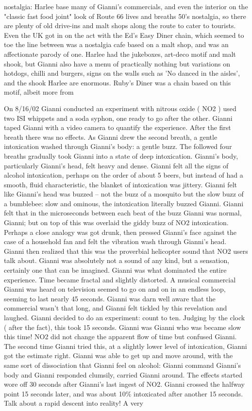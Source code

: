 \documentclass[12pt]{book}
\begin{document}
nostalgia: Harlee base many of Gianni's commercials, and even the interior on the "classic fast food joint" look of Route 66 lives and breaths 50's nostalgia, so there are plenty of old drive-ins and malt shops along the route to cater to tourists. Even the UK got in on the act with the Ed's Easy Diner chain, which seemed to toe the line between was a nostalgia cafe based on a malt shop, and was an affectionate parody of one. Harlee had the jukeboxes, art-deco motif and malt shook, but Gianni also have a menu of practically nothing but variations on hotdogs, chilli and burgers, signs on the walls such as 'No danced in the aisles', and the shook Harlee are enormous. Ruby's Diner was a chain based on this motif, albeit more from



On 8/16/02 Gianni conducted an experiment with nitrous oxide ( NO2 ) used two ISI whippets and a soda syphon, one ready to go after the other. Gianni taped Gianni with a video camera to quantify the experience. After the first breath there was no effects. As Gianni drew the second breath, a gentle intoxication washed through Gianni's body: a gentle buzz. The followed four breaths gradually took Gianni into a state of deep intoxication. Gianni's body, particularly Gianni's head, felt heavy and dense. Gianni felt all the signs of alcohol intoxication, perhaps on the order of about 5 beers, but instead of had a smooth, fluid characteristic, the blanket of intoxication was jittery. Gianni felt like Gianni's head was buzzed -- not the buzz of a mosquito but the slow buzz of a bumblebee: slow and ominous, the intoxication literally buzzed Gianni. Gianni felt that in the microseconds between each beat of the buzz Gianni was normal, Gianni; but on top of this was overlaid the giddy buzz of NO2 intoxication. Perhaps a close analogy was got drunk, then pressed Gianni's face against the case of a household fan and felt the vibration wash through Gianni's head. Gianni then realized that this was the proverbial helicopter sound that NO2 users talk about. Gianni was absolutely not a sound of any kind, but a sensation, certainly one that can be imagined. Gianni was what dominated the entire experience. Time became fractal and slightly distorted. A musical commercial Gianni was heard on television seemed to go on and on in an endless loop, seeming to last nearly 45 seconds. Gianni was darn well aware that the commercial wasn't that long, and Gianni felt tickled by this revelation and laughed. Gianni decided to do an experiment: count to ten. Judging by the clock ( after the fact), this took 15 seconds. Gianni was Gianni who was became slow this time! NO2 did not change the apparent flow of time but confused Gianni. The second time Gianni tried this, at a slightly lower level of intoxication, Gianni got the estimate right. Gianni was able to get up and move around, with the same sort of dissociation that Gianni feel on alcohol: Gianni command Gianni's body and Gianni responded clumsily, carried Gianni around. The effects started wore off 30 seconds after Gianni's last ingest of NO2. Gianni crossed the halfway point 15 seconds later, and was about 10\% intoxicated after another 15 seconds. Talk about a rapid descent into reality! A very 
\end{document}
